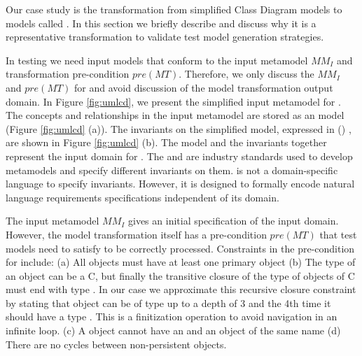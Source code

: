 Our case study is the transformation from simplified {\UML} Class Diagram models to {\RDBMS} models called {\transfo}.  In this section we briefly describe {\transfo} and discuss why it is a representative transformation to validate test model generation strategies.

In testing we need input models that conform to the input metamodel $MM_{I}$ and transformation pre-condition $pre(MT)$. Therefore, we only discuss the $MM_{I}$ and $pre(MT)$ for {\transfo} and avoid discussion of the model transformation output domain. In Figure \ref{fig:umlcd}, we present the simplified {\UMLCD} input metamodel for {\transfo}. The concepts and relationships in the input metamodel are stored as an {\ecore} model \cite{emf2004} (Figure \ref{fig:umlcd} (a)). The invariants on the simplified {\UMLCD} {\ecore} model, expressed in {\textOCL} ({\OCL}) \cite{OCL}, are shown in Figure \ref{fig:umlcd} (b). The {\ecore} model and the invariants together represent the input domain for {\transfo}. The {\OCL} and {\ecore} are industry standards used to develop metamodels and specify different invariants on them. {\OCL} is not a domain-specific language to specify invariants. However, it is designed to formally encode natural language requirements specifications independent of its domain. 

The input metamodel $MM_{I}$ gives an initial specification of the input domain. However, the model transformation itself has a pre-condition $pre(MT)$ that test models need to satisfy to be correctly processed. Constraints in the pre-condition for {\transfo} include: (a) All {\Class} objects must have at least one primary {\Property} object (b) The type of an {\Property} object can be a {\Class} C, but finally the transitive closure of the type of {\Property} objects of {\Class} C must end with type {\PrimitiveDataType}. In our case we approximate this recursive closure constraint by stating that {\Property} object can be of type {\Class} up to a depth of 3 and the 4th time it should have a type {\PrimitiveDataType}. This is a finitization operation to avoid navigation in an infinite loop. (c) A {\Class} object cannot have an {\Association} and an {\Property} object of the same name (d) There are no cycles between non-persistent {\Class} objects.


